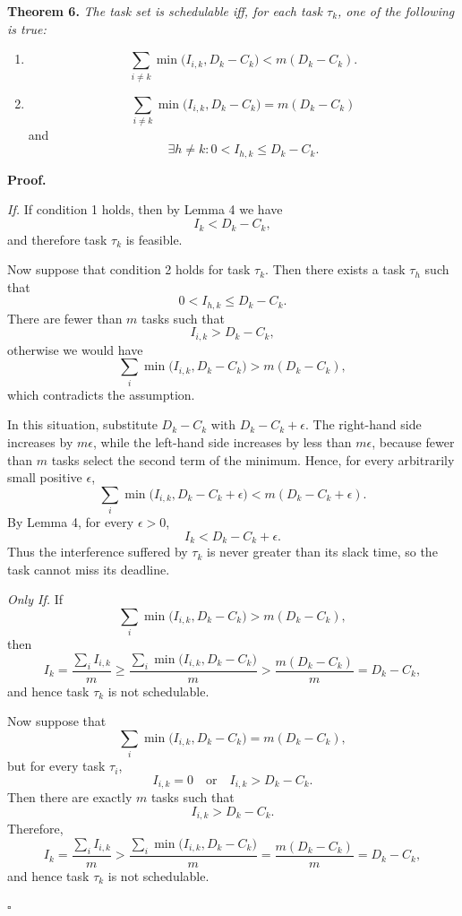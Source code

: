 \textbf{Theorem 6.}
\textit{The task set is schedulable iff, for each task $\tau_k$, one of the following is true:}

\begin{enumerate}
  \item
  \[
    \sum_{i \ne k} \min\bigl(I_{i,k}, D_k - C_k\bigr)
    <
    m(D_k - C_k).
  \]

  \item
  \[
    \sum_{i \ne k} \min\bigl(I_{i,k}, D_k - C_k\bigr)
    =
    m(D_k - C_k)
  \]
  and
  \[
    \exists h \ne k : 0 < I_{h,k} \leq D_k - C_k.
  \]
\end{enumerate}

\bigskip

\noindent
\textbf{Proof.}

\bigskip

\noindent
\textit{If.}
If condition 1 holds, then by Lemma 4 we have
\[
  I_k < D_k - C_k,
\]
and therefore task $\tau_k$ is feasible.

Now suppose that condition 2 holds for task $\tau_k$. Then there exists a task
$\tau_h$ such that
\[
  0 < I_{h,k} \leq D_k - C_k.
\]
There are fewer than $m$ tasks such that
\[
  I_{i,k} > D_k - C_k,
\]
otherwise we would have
\[
  \sum_i \min\bigl(I_{i,k}, D_k - C_k\bigr)
  >
  m(D_k - C_k),
\]
which contradicts the assumption.

In this situation, substitute $D_k - C_k$ with $D_k - C_k + \epsilon$.
The right-hand side increases by $m\epsilon$, while the left-hand side increases
by less than $m\epsilon$, because fewer than $m$ tasks select the second term of
the minimum. Hence, for every arbitrarily small positive $\epsilon$,
\[
  \sum_i \min\bigl(I_{i,k}, D_k - C_k + \epsilon\bigr)
  <
  m(D_k - C_k + \epsilon).
\]
By Lemma 4, for every $\epsilon > 0$,
\[
  I_k < D_k - C_k + \epsilon.
\]
Thus the interference suffered by $\tau_k$ is never greater than its slack time,
so the task cannot miss its deadline.

\bigskip

\noindent
\textit{Only If.}
If
\[
  \sum_i \min\bigl(I_{i,k}, D_k - C_k\bigr)
  >
  m(D_k - C_k),
\]
then
\[
  I_k
  =
  \frac{\sum_i I_{i,k}}{m}
  \geq
  \frac{\sum_i \min\bigl(I_{i,k}, D_k - C_k\bigr)}{m}
  >
  \frac{m(D_k - C_k)}{m}
  =
  D_k - C_k,
\]
and hence task $\tau_k$ is not schedulable.

Now suppose that
\[
  \sum_i \min\bigl(I_{i,k}, D_k - C_k\bigr)
  =
  m(D_k - C_k),
\]
but for every task $\tau_i$,
\[
  I_{i,k} = 0
  \quad\text{or}\quad
  I_{i,k} > D_k - C_k.
\]
Then there are exactly $m$ tasks such that
\[
  I_{i,k} > D_k - C_k.
\]
Therefore,
\[
  I_k
  =
  \frac{\sum_i I_{i,k}}{m}
  >
  \frac{\sum_i \min\bigl(I_{i,k}, D_k - C_k\bigr)}{m}
  =
  \frac{m(D_k - C_k)}{m}
  =
  D_k - C_k,
\]
and hence task $\tau_k$ is not schedulable.

\hfill $\square$